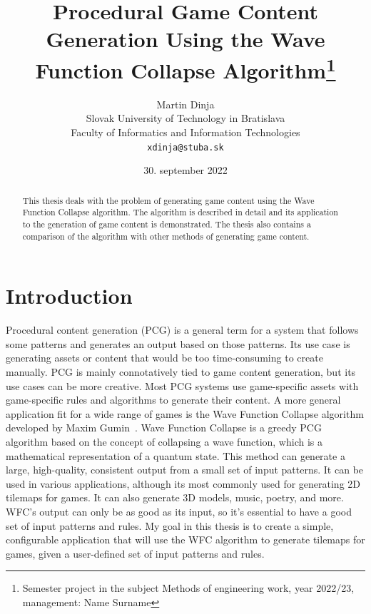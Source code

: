 \documentclass[10pt,oneside,a4paper]{article}
\title{Procedural Game Content Generation Using the Wave Function Collapse Algorithm\thanks{Semester project in the subject Methods of engineering work, year 2022/23, management: Name Surname}}
\author{Martin Dinja\\[2pt]
	{\small Slovak University of Technology in Bratislava}\\
	{\small Faculty of Informatics and Information Technologies}\\
	{\small \texttt{xdinja@stuba.sk}}
}
\date{\small 30. september 2022}
\begin{document}
\maketitle

\tableofcontents

\begin{abstract}
    \begin{center}
        This thesis deals with the problem of generating game content using the Wave Function Collapse algorithm. The algorithm is described in detail and its application to the generation of game content is demonstrated. The thesis also contains a comparison of the algorithm with other methods of generating game content.
    \end{center}
\end{abstract}

\section{Introduction}\label{sec:introduction}

Procedural content generation (PCG) is a general term for a system that follows some patterns and generates an output based on those patterns.
Its use case is generating assets or content that would be too time-consuming to create manually.
PCG is mainly connotatively tied to game content generation, but its use cases can be more creative.
Most PCG systems use game-specific assets with game-specific rules and algorithms to generate their content.
A more general application fit for a wide range of games is the Wave Function Collapse algorithm developed by Maxim Gumin~\cite{WFC}.
Wave Function Collapse is a greedy PCG algorithm based on the concept of collapsing a wave function, which is a mathematical representation of a quantum state.
This method can generate a large, high-quality, consistent output from a small set of input patterns.
It can be used in various applications, although its most commonly used for generating 2D tilemaps for games.
It can also generate 3D models, music, poetry, and more.
WFC's output can only be as good as its input, so it's essential to have a good set of input patterns and rules. 
My goal in this thesis is to create a simple, configurable application that will use the WFC algorithm to generate tilemaps for games, given a user-defined set of input patterns and rules.
\end{document}
